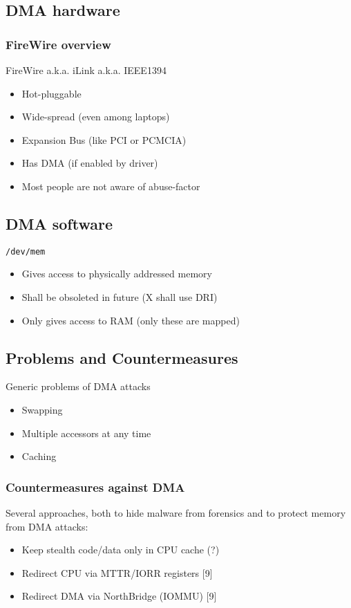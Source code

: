 \documentclass{beamer}
\newenvironment{itemizeframe}[1]
  {\begin{frame}{#1}\startitemizeframe}
  {\stopitemizeframe\end{frame}}
\newcommand\startitemizeframe{\begin{itemize}}
\newcommand\stopitemizeframe{\end{itemize}}
\begin{document}
	\subsection{DMA hardware}

		\begin{frame} \frametitle{FireWire overview}
			 FireWire a.k.a. iLink a.k.a. IEEE1394
			\begin{itemize}
				\item Hot-pluggable
				\item Wide-spread (even among laptops)
				\item Expansion Bus (like PCI or PCMCIA)
				\item Has DMA (if enabled by driver)
				\item Most people are not aware of abuse-factor
			\end{itemize}
		\end{frame}

	\subsection{DMA software}

		\begin{itemizeframe}{\texttt{/dev/mem}}
			\item Gives access to physically addressed memory
			\item Shall be obsoleted in future (X shall use DRI)
			\item Only gives access to  RAM (only these are mapped)
		\end{itemizeframe}

	\subsection{Problems and Countermeasures}

		\begin{itemizeframe}{Generic problems of DMA attacks}
			\item Swapping
			\item Multiple accessors at any time
			\item Caching
		\end{itemizeframe}
		
		\begin{frame} \frametitle{Countermeasures against DMA}
			Several approaches, both to hide malware from forensics and to protect memory from DMA attacks:

			\begin{itemize}
				\item Keep stealth code/data only in CPU cache (?)
				\item Redirect CPU via MTTR/IORR registers [9]
				\item Redirect DMA via NorthBridge (IOMMU) [9]
			\end{itemize}

		\end{frame}
\end{document}
